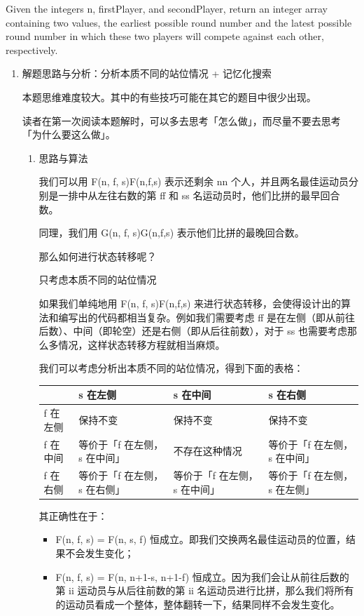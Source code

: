 \documentclass[9pt, b5paaper]{book}
\begin{document}
Given the integers n, firstPlayer, and secondPlayer, return an integer array containing two values, the earliest possible round number and the latest possible round number in which these two players will compete against each other, respectively.
\begin{enumerate}
\item 解题思路与分析：分析本质不同的站位情况 + 记忆化搜索
\label{sec-1-0-8-1}

本题思维难度较大。其中的有些技巧可能在其它的题目中很少出现。

读者在第一次阅读本题解时，可以多去思考「怎么做」，而尽量不要去思考「为什么要这么做」。

\begin{enumerate}
\item 思路与算法
\label{sec-1-0-8-1-1}

我们可以用 F(n, f, s)F(n,f,s) 表示还剩余 nn 个人，并且两名最佳运动员分别是一排中从左往右数的第 ff 和 ss 名运动员时，他们比拼的最早回合数。

同理，我们用 G(n, f, s)G(n,f,s) 表示他们比拼的最晚回合数。

那么如何进行状态转移呢？

只考虑本质不同的站位情况

如果我们单纯地用 F(n, f, s)F(n,f,s) 来进行状态转移，会使得设计出的算法和编写出的代码都相当复杂。例如我们需要考虑 ff 是在左侧（即从前往后数）、中间（即轮空）还是右侧（即从后往前数），对于 ss 也需要考虑那么多情况，这样状态转移方程就相当麻烦。

我们可以考虑分析出本质不同的站位情况，得到下面的表格：
\begin{center}
\begin{tabular}{llll}
\hline
 & s 在左侧 & s 在中间 & s 在右侧\\
\hline
f 在左侧 & 保持不变 & 保持不变 & 保持不变\\
f 在中间 & 等价于「f 在左侧，s 在中间」 & 不存在这种情况 & 等价于「f 在左侧，s 在中间」\\
f 在右侧 & 等价于「f 在左侧，s 在右侧」 & 等价于「f 在左侧，s 在中间」 & 等价于「f 在左侧，s 在左侧」\\
\hline
\end{tabular}
\end{center}
其正确性在于：

\begin{itemize}
\item F(n, f, s) = F(n, s, f) 恒成立。即我们交换两名最佳运动员的位置，结果不会发生变化；
\item F(n, f, s) = F(n, n+1-s, n+1-f) 恒成立。因为我们会让从前往后数的第 ii 运动员与从后往前数的第 ii 名运动员进行比拼，那么我们将所有的运动员看成一个整体，整体翻转一下，结果同样不会发生变化。
\end{itemize}


\end{enumerate}
\end{enumerate}
\end{document}
